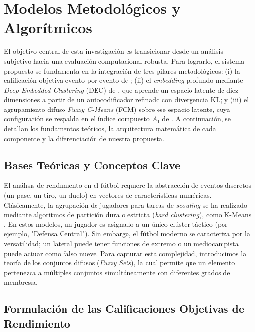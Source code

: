 \documentclass[conference]{IEEEtran}
\begin{document}
\section{Modelos Metodológicos y Algorítmicos}

El objetivo central de esta investigación es transicionar desde un análisis subjetivo hacia una evaluación computacional robusta. Para lograrlo, el sistema propuesto se fundamenta en la integración de tres pilares metodológicos: (i) la calificación objetiva evento por evento de \cite{evers2024visual}; (ii) el \textit{embedding} profundo mediante \textit{Deep Embedded Clustering} (DEC) de \cite{demir2026how}, que aprende un espacio latente de diez dimensiones a partir de un autocodificador refinado con divergencia KL; y (iii) el agrupamiento difuso \textit{Fuzzy C-Means} (FCM) \cite{pacifico2025fuzzy} sobre ese espacio latente, cuya configuración se respalda en el índice compuesto $A_1$ de \cite{akhanli2022clustering}. A continuación, se detallan los fundamentos teóricos, la arquitectura matemática de cada componente y la diferenciación de nuestra propuesta.

\subsection{Bases Teóricas y Conceptos Clave}
El análisis de rendimiento en el fútbol requiere la abstracción de eventos discretos (un pase, un tiro, un duelo) en vectores de características numéricas. Clásicamente, la agrupación de jugadores para tareas de \textit{scouting} se ha realizado mediante algoritmos de partición dura o estricta (\textit{hard clustering}), como K-Means \cite{janetzko2014feature}. En estos modelos, un jugador es asignado a un único clúster táctico (por ejemplo, "Defensa Central"). Sin embargo, el fútbol moderno se caracteriza por la versatilidad; un lateral puede tener funciones de extremo o un mediocampista puede actuar como falso nueve. Para capturar esta complejidad, introducimos la teoría de los conjuntos difusos (\textit{Fuzzy Sets}), la cual permite que un elemento pertenezca a múltiples conjuntos simultáneamente con diferentes grados de membresía.

\subsection{Formulación de las Calificaciones Objetivas de Rendimiento}
\label{subsec:calificaciones}
\end{document}

